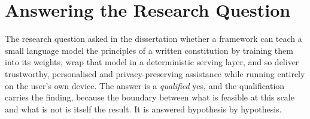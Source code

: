 \section{Answering the Research Question}
\label{sec:conclusion-answer}

The research question asked in the dissertation whether a framework can teach a small language model the principles of a written constitution by training them into its weights, wrap that model in a deterministic serving layer, and so deliver trustworthy, personalised and privacy-preserving assistance while running entirely on the user's own device. The answer is a \emph{qualified} yes, and the qualification carries the finding, because the boundary between what is feasible at this scale and what is not is itself the result. It is answered hypothesis by hypothesis.


